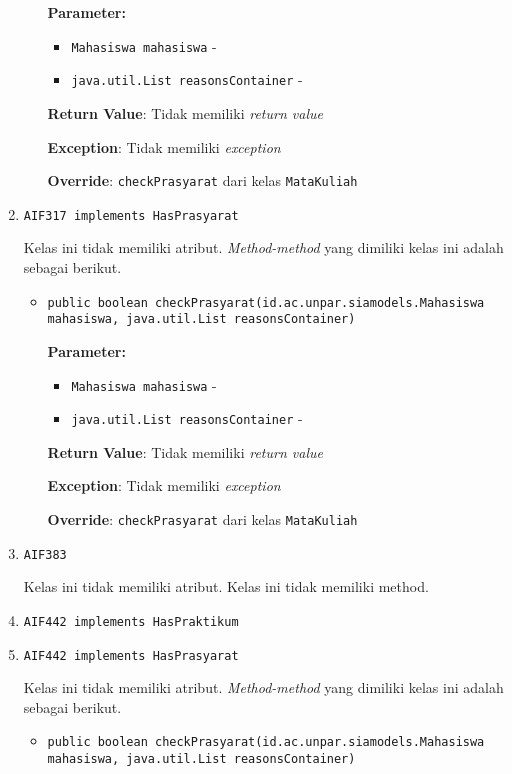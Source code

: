 \documentclass{article}
\begin{document}
\begin{enumerate}
\begin{itemize}
\textbf{Parameter:}
\begin{itemize}
\item \texttt{Mahasiswa mahasiswa} - 
\item \texttt{java.util.List reasonsContainer} - 
\end{itemize}
\textbf{Return Value}: Tidak memiliki \textit{return value}

\textbf{Exception}: Tidak memiliki \textit{exception}

\textbf{Override}: \texttt{checkPrasyarat} dari kelas \texttt{MataKuliah}

\end{itemize}
\item \texttt{AIF317 implements HasPrasyarat}



Kelas ini tidak memiliki atribut. \textit{Method-method} yang dimiliki kelas ini adalah sebagai berikut.
\begin{itemize}
\item \texttt{public boolean checkPrasyarat(id.ac.unpar.siamodels.Mahasiswa mahasiswa, java.util.List reasonsContainer)}

\textbf{Parameter:}
\begin{itemize}
\item \texttt{Mahasiswa mahasiswa} - 
\item \texttt{java.util.List reasonsContainer} - 
\end{itemize}
\textbf{Return Value}: Tidak memiliki \textit{return value}

\textbf{Exception}: Tidak memiliki \textit{exception}

\textbf{Override}: \texttt{checkPrasyarat} dari kelas \texttt{MataKuliah}

\end{itemize}
\item \texttt{AIF383}



Kelas ini tidak memiliki atribut. Kelas ini tidak memiliki method. \item \texttt{AIF442 implements HasPraktikum}

\item \texttt{AIF442 implements HasPrasyarat}



Kelas ini tidak memiliki atribut. \textit{Method-method} yang dimiliki kelas ini adalah sebagai berikut.
\begin{itemize}
\item \texttt{public boolean checkPrasyarat(id.ac.unpar.siamodels.Mahasiswa mahasiswa, java.util.List reasonsContainer)}


\end{itemize}
\end{enumerate}
\end{document}

